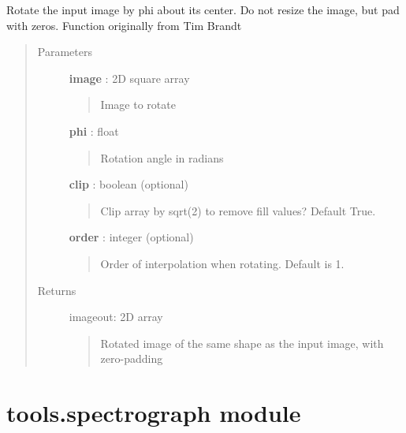 \documentclass[letterpaper,10pt,english]{sphinxmanual}
\begin{document}
\begin{fulllineitems}
\label{tools:tools.rotate.Rotate}
Rotate the input image by phi about its center.  Do not resize the 
image, but pad with zeros.  Function originally from Tim Brandt
\begin{quote}\begin{description}
\item[{Parameters}] \leavevmode
\textbf{image} : 2D square array
\begin{quote}

Image to rotate
\end{quote}

\textbf{phi} : float
\begin{quote}

Rotation angle in radians
\end{quote}

\textbf{clip} :  boolean (optional)
\begin{quote}

Clip array by sqrt(2) to remove fill values?  Default True.
\end{quote}

\textbf{order} : integer (optional)
\begin{quote}

Order of interpolation when rotating. Default is 1.
\end{quote}

\item[{Returns}] \leavevmode
imageout: 2D array
\begin{quote}

Rotated image of the same shape as the input image, with zero-padding
\end{quote}

\end{description}\end{quote}

\end{fulllineitems}



\section{tools.spectrograph module}
\label{tools:tools-spectrograph-module}\label{tools:module-tools.spectrograph}
\end{document}
